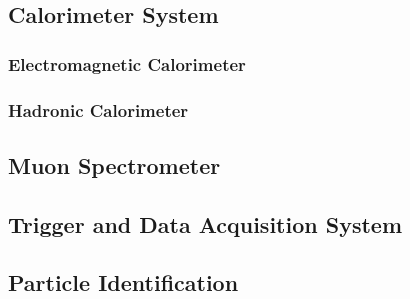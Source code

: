 \subsection{Calorimeter System}
\subsubsection{Electromagnetic Calorimeter}
\subsubsection{Hadronic Calorimeter}
\subsection{Muon Spectrometer}
\subsection{Trigger and Data Acquisition System}
\subsection{Particle Identification} 
